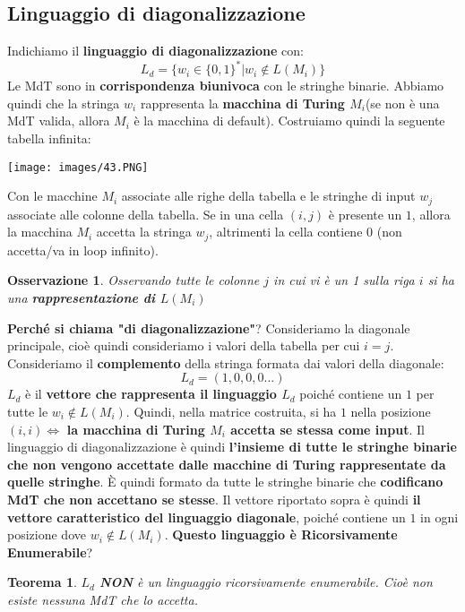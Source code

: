 \documentclass[12pt]{article}
\newtheorem{Teorema}{Teorema}[subsection]
\newtheorem{Osservazione}{Osservazione}[subsection]
\begin{document}
\subsection{Linguaggio di diagonalizzazione}
Indichiamo il \textbf{linguaggio di diagonalizzazione} con:
$$L_d = \{w_i \in \{0, 1\}^*|w_i \not\in L(M_i)\}$$
Le MdT sono in \textbf{corrispondenza biunivoca} con le stringhe binarie. Abbiamo quindi che la stringa $w_i$ rappresenta la \textbf{macchina di Turing $M_i$}(se non è una MdT valida, allora $M_i$ è la macchina di default). Costruiamo quindi la seguente tabella infinita:
\begin{center}
    \texttt{[image: images/43.PNG]}
\end{center}
Con le macchine $M_i$ associate alle righe della tabella e le stringhe di input $w_j$ associate alle colonne della tabella. Se in una cella $(i, j)$ è presente un $1$, allora la macchina $M_i$ accetta la stringa $w_j$, altrimenti la cella contiene 0 (non accetta/va in loop infinito).
\begin{Osservazione}
    Osservando tutte le colonne $j$ in cui vi è un 1 sulla riga $i$ si ha una \textbf{rappresentazione di $L(M_i)$}
\end{Osservazione}
\textbf{Perché si chiama "di diagonalizzazione"}? \newline
Consideriamo la diagonale principale, cioè quindi consideriamo i valori della tabella per cui $i = j$. Consideriamo il \textbf{complemento} della stringa formata dai valori della diagonale:
$$L_d = (1,0,0,0...)$$
$L_d$ è il \textbf{vettore che rappresenta il linguaggio $L_d$} poiché contiene un $1$ per tutte le $w_i \not\in L(M_i)$. Quindi, nella matrice costruita, si ha $1$ nella posizione $(i, i) \Leftrightarrow$ \textbf{la macchina di Turing $M_i$ accetta se stessa come input}. \newline
Il linguaggio di diagonalizzazione è quindi \textbf{l'insieme di tutte le stringhe binarie che non vengono accettate dalle macchine di Turing rappresentate da quelle stringhe}. È quindi formato da tutte le stringhe binarie che \textbf{codificano MdT che non accettano se stesse}. Il vettore riportato sopra è quindi \textbf{il vettore caratteristico del linguaggio diagonale}, poiché contiene un $1$ in ogni posizione dove $w_i \not\in L(M_i)$. \newline \newline
\textbf{Questo linguaggio è Ricorsivamente Enumerabile}?
\begin{Teorema}
    $L_d$ \textbf{NON} è un linguaggio ricorsivamente enumerabile. Cioè non esiste nessuna MdT che lo accetta.
\end{Teorema}
\end{document}
